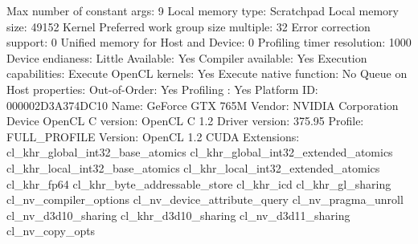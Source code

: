 \begin{codebox}[text]
  Max number of constant args:                   9
  Local memory type:                             Scratchpad
  Local memory size:                             49152
  Kernel Preferred work group size multiple:     32
  Error correction support:                      0
  Unified memory for Host and Device:            0
  Profiling timer resolution:                    1000
  Device endianess:                              Little
  Available:                                     Yes
  Compiler available:                            Yes
  Execution capabilities:
    Execute OpenCL kernels:                      Yes
    Execute native function:                     No
  Queue on Host properties:
    Out-of-Order:                                Yes
    Profiling :                                  Yes
  Platform ID:                                   000002D3A374DC10
  Name:                                          GeForce GTX 765M
  Vendor:                                        NVIDIA Corporation
  Device OpenCL C version:                       OpenCL C 1.2
  Driver version:                                375.95
  Profile:                                       FULL_PROFILE
  Version:                                       OpenCL 1.2 CUDA
  Extensions:
   cl_khr_global_int32_base_atomics
   cl_khr_global_int32_extended_atomics
   cl_khr_local_int32_base_atomics
   cl_khr_local_int32_extended_atomics
   cl_khr_fp64
   cl_khr_byte_addressable_store
   cl_khr_icd
   cl_khr_gl_sharing
   cl_nv_compiler_options
   cl_nv_device_attribute_query
   cl_nv_pragma_unroll
   cl_nv_d3d10_sharing
   cl_khr_d3d10_sharing
   cl_nv_d3d11_sharing
   cl_nv_copy_opts


\end{codebox}
